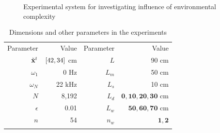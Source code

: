 \begin{figure}[ht]
	\centering
	\caption{Experimental system for investigating influence of environmental complexity}
	\label{fig:p-map}
\end{figure}

\begin{table}[htbp]
\centering \caption{Dimensions and other parameters in the experiments}
\label{tab:s-noise}
\begin{tabular}{r|r||r|r}
\hline\noalign{\smallskip}
\footnotesize{Parameter} & Value & \footnotesize{Parameter} & Value\\
\noalign{\smallskip}\hline\noalign{\smallskip}
$\tilde {\mathbf{x}}^{t}$ & $\left [ 42, 34 \right ]$ cm & $L$ &  90 cm \\
$\omega_1$ & 0 Hz & $L_{m}$ &  50 cm\\
$\omega_N$ & 22 kHz & $L_{s}$ &  10 cm\\
$N$ & 8,192 & $L_{d}$ &  $\bm{0,10,20,30}$ cm\\ 
$\epsilon$ & 0.01 & $L_{w}$ &  $\bm{50,60,70}$ cm\\
$n$ & 54 & $n_{w}$ & $\bm{1,2}$\\
\noalign{\smallskip}\hline\noalign{\smallskip}
\end{tabular}
\end{table}

